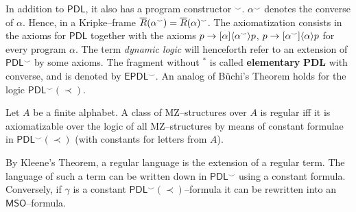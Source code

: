 In addition to $\mathsf{PDL}$, 
it also has a program constructor 
$^{\smallsmile}$.
$\alpha^{\smallsmile}$ denotes the converse of $\alpha$.
Hence, in a Kripke--frame $\overline{R}(\alpha^{\smallsmile}) =
\overline{R}(\alpha)^{\smallsmile}$. The axiomatization consists
in the axioms for $\mathsf{PDL}$ together with the axioms
$p \rightarrow [\alpha]\langle \alpha^{\smallsmile}\rangle p$,
$p \rightarrow [\alpha^{\smallsmile}]\langle \alpha\rangle p$ for every
program $\alpha$. The term {\it dynamic logic\/} will henceforth
refer to an extension of $\mathsf{PDL}^{\smallsmile}$ by
some axioms. The fragment without $^{\ast}$ is called
\textbf{elementary} $\textbf{PDL}$ with converse, and is 
denoted by $\mathsf{EPDL}^{\smallsmile}$. 
An analog of B\"uchi's Theorem
holds for the logic $\mathsf{PDL}^{\smallsmile}(\prec)$.
\begin{thm}
Let $A$ be a finite alphabet. A class of MZ--struc\-tu\-res over $A$
is regular iff it is axiomatizable over the logic of
all MZ--structures by means of constant formulae in
$\mathsf{PDL}^{\smallsmile}(\prec)$ (with constants for
letters from $A$).
\end{thm}
\proofbeg
By Kleene's Theorem, a regular language is the extension of a regular
term. The language of such a term can be written down in 
$\mathsf{PDL}^{\smallsmile}$ using a constant formula. Conversely, 
if $\gamma$ is a constant
$\mathsf{PDL}^{\smallsmile}(\prec)$--formula it can be rewritten
into an $\mathsf{MSO}$--formula.
\proofend

